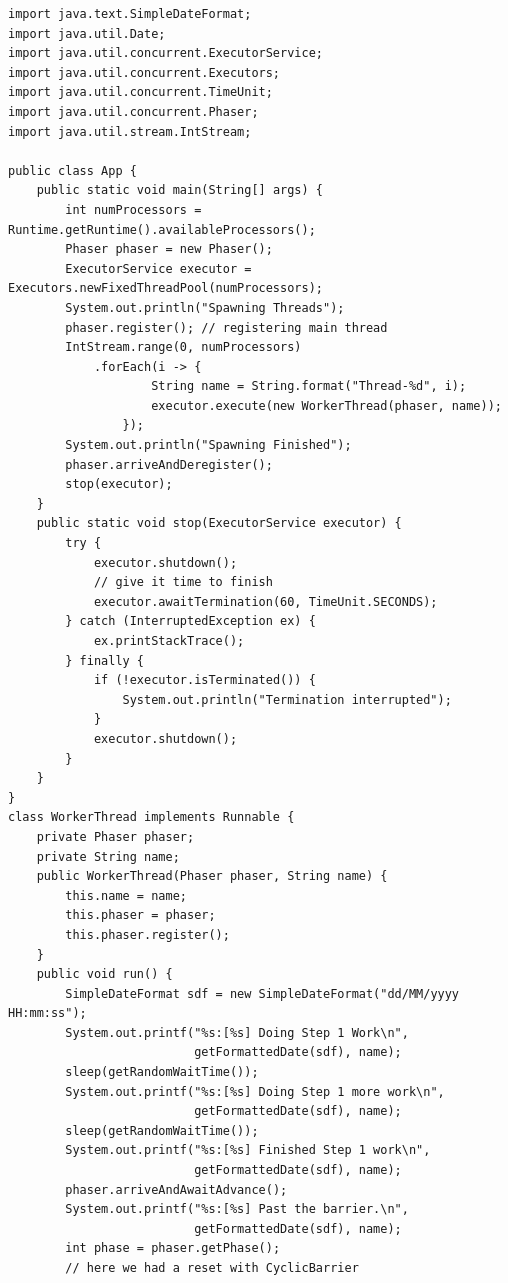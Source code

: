 \documentclass{latex/classes/thesis}
\begin{document}
\begin{lstlisting}
import java.text.SimpleDateFormat;
import java.util.Date;
import java.util.concurrent.ExecutorService;
import java.util.concurrent.Executors;
import java.util.concurrent.TimeUnit;
import java.util.concurrent.Phaser;
import java.util.stream.IntStream;

public class App {
    public static void main(String[] args) {
        int numProcessors = Runtime.getRuntime().availableProcessors();
        Phaser phaser = new Phaser();
        ExecutorService executor = Executors.newFixedThreadPool(numProcessors);
        System.out.println("Spawning Threads");
        phaser.register(); // registering main thread
        IntStream.range(0, numProcessors)
            .forEach(i -> {
                    String name = String.format("Thread-%d", i);
                    executor.execute(new WorkerThread(phaser, name));
                });
        System.out.println("Spawning Finished");
        phaser.arriveAndDeregister();
        stop(executor);
    }
    public static void stop(ExecutorService executor) {
        try {
            executor.shutdown();
            // give it time to finish
            executor.awaitTermination(60, TimeUnit.SECONDS);
        } catch (InterruptedException ex) {
            ex.printStackTrace();
        } finally {
            if (!executor.isTerminated()) {
                System.out.println("Termination interrupted");
            }
            executor.shutdown();
        }
    }
}
class WorkerThread implements Runnable {
    private Phaser phaser;
    private String name;
    public WorkerThread(Phaser phaser, String name) {
        this.name = name;
        this.phaser = phaser;
        this.phaser.register();
    }
    public void run() {
        SimpleDateFormat sdf = new SimpleDateFormat("dd/MM/yyyy HH:mm:ss");
        System.out.printf("%s:[%s] Doing Step 1 Work\n",
                          getFormattedDate(sdf), name);
        sleep(getRandomWaitTime());
        System.out.printf("%s:[%s] Doing Step 1 more work\n",
                          getFormattedDate(sdf), name);
        sleep(getRandomWaitTime());
        System.out.printf("%s:[%s] Finished Step 1 work\n",
                          getFormattedDate(sdf), name);
        phaser.arriveAndAwaitAdvance();
        System.out.printf("%s:[%s] Past the barrier.\n",
                          getFormattedDate(sdf), name);
        int phase = phaser.getPhase();
        // here we had a reset with CyclicBarrier

\end{lstlisting}
\end{document}
